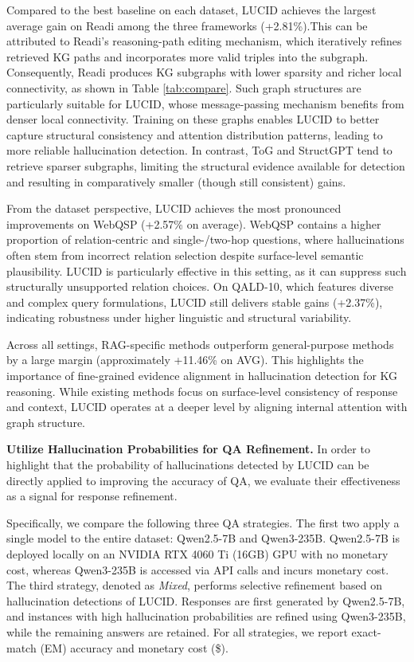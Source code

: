 \documentclass[11pt]{article}
\begin{document}
Compared to the best baseline on each dataset, LUCID achieves the largest average gain on Readi among the three frameworks (+2.81\%).This can be attributed to Readi’s reasoning-path editing mechanism, which iteratively refines retrieved KG paths and incorporates more valid triples into the subgraph. Consequently, Readi produces KG subgraphs with lower sparsity and richer local connectivity, as shown in Table \ref{tab:compare}. Such graph structures are particularly suitable for LUCID, whose message-passing mechanism benefits from denser local connectivity. Training on these graphs enables LUCID to better capture structural consistency and attention distribution patterns, leading to more reliable hallucination detection.
In contrast, ToG and StructGPT tend to retrieve sparser subgraphs, limiting the structural evidence available for detection and resulting in comparatively smaller (though still consistent) gains.

From the dataset perspective, LUCID achieves the most pronounced improvements on WebQSP (+2.57\% on average). WebQSP contains a higher proportion of relation-centric and single-/two-hop questions, where hallucinations often stem from incorrect relation selection despite surface-level semantic plausibility. LUCID is particularly effective in this setting, as it can suppress such structurally unsupported relation choices.
On QALD-10, which features diverse and complex query formulations, LUCID still delivers stable gains (+2.37\%), indicating robustness under higher linguistic and structural variability.

Across all settings, RAG-specific methods outperform general-purpose methods by a large margin (approximately +11.46\% on AVG). This highlights the importance of fine-grained evidence alignment in hallucination detection for KG reasoning. While existing methods focus on surface-level consistency of response and context, LUCID operates at a deeper level by aligning internal attention with graph structure.

\textbf{Utilize Hallucination Probabilities for QA Refinement.} In order to highlight that the probability of hallucinations detected by LUCID can be directly applied to improving the accuracy of QA, we evaluate their effectiveness as a signal for response refinement.

Specifically, we compare the following three QA strategies. The first two apply a single model to the entire dataset: Qwen2.5-7B and Qwen3-235B. Qwen2.5-7B is deployed locally on an NVIDIA RTX 4060 Ti (16GB) GPU with no monetary cost, whereas Qwen3-235B is accessed via API calls and incurs monetary cost.
The third strategy, denoted as \textit{Mixed}, performs selective refinement based on hallucination detections of LUCID. Responses are first generated by Qwen2.5-7B, and instances with high hallucination probabilities are refined using Qwen3-235B, while the remaining answers are retained.
For all strategies, we report exact-match (EM) accuracy and monetary cost (\$).
\end{document}
